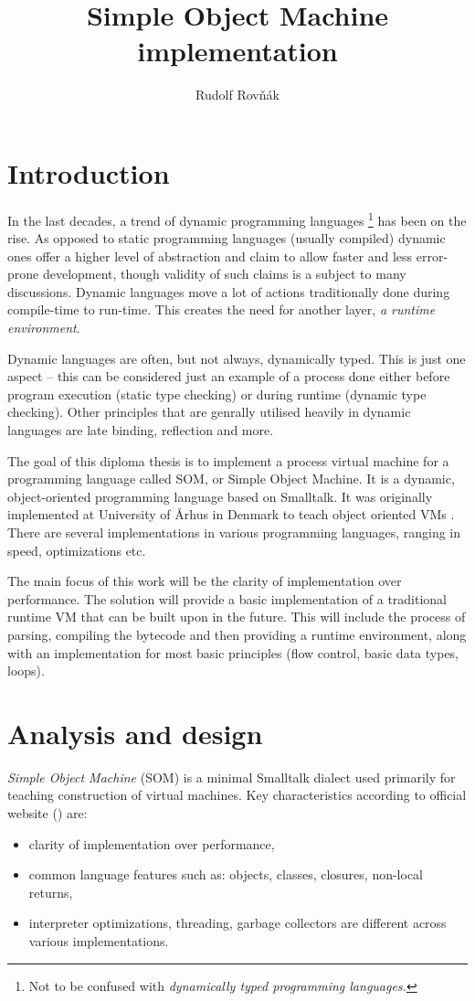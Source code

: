 \documentclass[thesis=M,english]{FITthesis}[2019/12/23]
\title{Simple Object Machine implementation}
\author{Rudolf Rovňák} %
\begin{document}

\setcounter{secnumdepth}{3}
\chapter{Introduction}
In the last decades, a trend of dynamic programming languages \footnote{Not to be confused with \textit{dynamically typed programming languages.}} has been on the rise.
As opposed to static programming languages (usually compiled) dynamic ones offer a higher level of abstraction and claim to allow faster and less error-prone development,
though validity of such claims is a subject to many discussions.
Dynamic languages move a lot of actions traditionally done during compile-time to run-time. This creates the need for another layer, \textit{a runtime environment}.

Dynamic languages are often, but not always, dynamically typed. This is just one aspect -- this can be considered just an example of a process done
either before program execution (static type checking) or during runtime (dynamic type checking). Other principles that are genrally utilised heavily in
dynamic languages are late binding, reflection and more.

The goal of this diploma thesis is to implement a process virtual machine for a programming language called SOM, or Simple Object Machine. 
It is a dynamic, object-oriented programming language based on Smalltalk. It was originally implemented at University of Århus in Denmark to teach
object oriented VMs \cite{som-github}. There are several implementations in various programming languages, ranging in speed, optimizations etc.

The main focus of this work will be the clarity of implementation over performance. The solution will provide a basic implementation of a traditional runtime
VM that can be built upon in the future. This will include the process of parsing, compiling the bytecode and then providing a runtime environment,
along with an implementation for most basic principles (flow control, basic data types, loops).

\chapter{Analysis and design}
\textit{Simple Object Machine} (SOM) is a minimal Smalltalk dialect used primarily for teaching construction of virtual machines. Key characteristics
according to official website (\cite{som-github}) are:
\begin{itemize}
	\item clarity of implementation over performance,
	\item common language features such as: objects, classes, closures, non-local returns,
	\item interpreter optimizations, threading, garbage collectors are different
		across various implementations.
\end{itemize}
\end{document}
